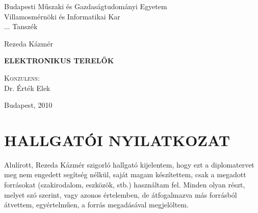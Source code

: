 \begin{center}

\begin{figure}[!h]
  \begin{center}
  \end{center}
\end{figure}

Budapesti Műszaki és Gazdaságtudományi Egyetem \\
Villamosmérnöki és Informatikai Kar\\
{\small ... Tanszék}

\thispagestyle{empty}

\pagestyle{empty}

\vspace{3.5cm}

\Large Rezeda Kázmér

\vspace{0.8cm}

\textbf{\uppercase{\LARGE Elektronikus Terel\H{o}k}}


\vfill

\textsc{Konzulens:}\\ \Large Dr. Érték Elek

\vspace{0.6cm}

\normalsize Budapest, 2010

\end{center}

\clearpage


\chapter*{\uppercase{Hallgatói nyilatkozat}}

\thispagestyle{empty}

Alulírott, Rezeda Kázmér szigorló hallgató kijelentem, hogy ezt a diplomatervet
meg nem engedett segítség nélkül, saját magam készítettem, csak a megadott
forrásokat (szakirodalom, eszközök, stb.) használtam fel. Minden olyan részt,
melyet szó szerint, vagy azonos értelemben, de átfogalmazva más forrásból
átvettem, egyértelműen, a forrás megadásával megjelöltem.

